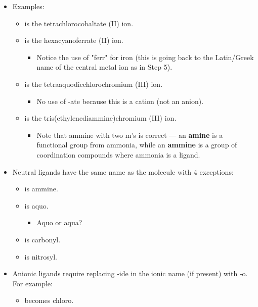 \documentclass[../notes.tex]{subfiles}
\begin{document}
\begin{itemize}
\begin{enumerate}
    \end{enumerate}
    \item Examples:
    \begin{itemize}
        \item {} is the tetrachlorocobaltate (II) ion.
        \item {} is the hexacyanoferrate (II) ion.
        \begin{itemize}
            \item Notice the use of "ferr" for iron (this is going back to the Latin/Greek name of the central metal ion as in Step 5).
        \end{itemize}
        \item \ce{[Cr(H2O)4Cl2]+} is the tetraaquodicchlorochromium (III) ion.
        \begin{itemize}
            \item No use of -ate because this is a cation (not an anion).
        \end{itemize}
        \item {} is the tris(ethylenediammine)chromium (III) ion.
        \begin{itemize}
            \item Note that ammine with two m's is correct --- an \textbf{amine} is a functional group from ammonia, while an \textbf{ammine} is a group of coordination compounds where ammonia is a ligand.
        \end{itemize}
    \end{itemize}
    \item Neutral ligands have the same name as the molecule with 4 exceptions:
    \begin{itemize}
        \item {} is ammine.
        \item {} is aquo.
        \begin{itemize}
            \item Aquo or aqua?
        \end{itemize}
        \item {} is carbonyl.
        \item {} is nitrosyl.
    \end{itemize}
    \item Anionic ligands require replacing -ide in the ionic name (if present) with -o. For example:
    \begin{itemize}
        \item {} becomes chloro.

\end{itemize}
\end{itemize}
\end{document}
